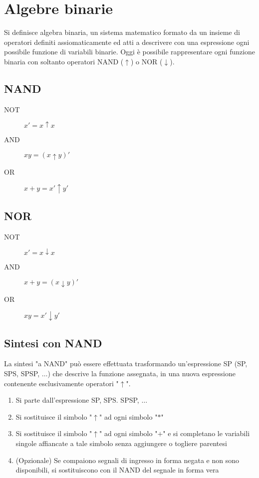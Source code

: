 \documentclass{article}
\begin{document}
\section{Algebre binarie}

Si definisce algebra binaria, un sistema matematico formato da un insieme di operatori definiti assiomaticamente ed atti a descrivere con una espressione ogni possibile funzione di variabili binarie.
Oggi è possibile rappresentare ogni funzione binaria con soltanto operatori NAND ($\uparrow$) o NOR ($\downarrow$).

\subsection{NAND}

\begin{description}
    \item[NOT] $x' = x \uparrow x$
    \item[AND] $xy = (x \uparrow y)'$
    \item[OR] $x+y = x' \uparrow y'$
\end{description}

\subsection{NOR}

\begin{description}
    \item[NOT] $x' = x \downarrow x$
    \item[AND] $x + y = (x \downarrow y)'$
    \item[OR] $xy = x' \downarrow y'$
\end{description}

\subsection{Sintesi con NAND}

La sintesi "a NAND" può essere effettuata trasformando un'espressione SP (SP, SPS, SPSP, $\dots$) che descrive la funzione assegnata, in una nuova espressione contenente esclusivamente operatori "$\uparrow$".

\begin{enumerate}
    \item Si parte dall'espressione SP, SPS. SPSP, $\dots$
    \item Si sostituisce il simbolo "$\uparrow$" ad ogni simbolo "$*$"
    \item Si sostituisce il simbolo "$\uparrow$" ad ogni simbolo "$+$" e si completano le variabili singole affiancate a tale simbolo senza aggiungere o togliere parentesi
    \item (Opzionale) Se compaiono segnali di ingresso in forma negata e non sono disponibili, si sostituiscono con il NAND del segnale in forma vera
\end{enumerate}
\end{document}
